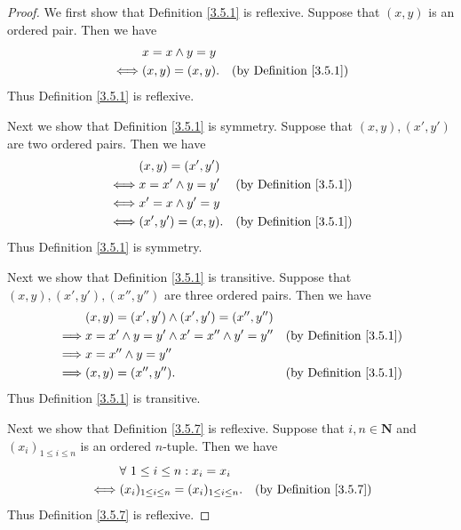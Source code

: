 \begin{proof}
    We first show that Definition \ref{3.5.1} is reflexive.
    Suppose that \((x, y)\) is an ordered pair.
    Then we have
    \begin{align*}
             & x = x \land y = y                                      \\
        \iff & (x, y) = (x, y).  & \text{(by Definition \ref{3.5.1})}
    \end{align*}
    Thus Definition \ref{3.5.1} is reflexive.

    Next we show that Definition \ref{3.5.1} is symmetry.
    Suppose that \((x, y), (x', y')\) are two ordered pairs.
    Then we have
    \begin{align*}
             & (x, y) = (x', y')                                        \\
        \iff & x = x' \land y = y' & \text{(by Definition \ref{3.5.1})} \\
        \iff & x' = x \land y' = y                                      \\
        \iff & (x', y') = (x, y).  & \text{(by Definition \ref{3.5.1})}
    \end{align*}
    Thus Definition \ref{3.5.1} is symmetry.

    Next we show that Definition \ref{3.5.1} is transitive.
    Suppose that \((x, y), (x', y'), (x'', y'')\) are three ordered pairs.
    Then we have
    \begin{align*}
                 & (x, y) = (x', y') \land (x', y') = (x'', y'')                                          \\
        \implies & x = x' \land y = y' \land x' = x'' \land y' = y'' & \text{(by Definition \ref{3.5.1})} \\
        \implies & x = x'' \land y = y''                                                                  \\
        \implies & (x, y) = (x'', y'').                              & \text{(by Definition \ref{3.5.1})}
    \end{align*}
    Thus Definition \ref{3.5.1} is transitive.

    Next we show that Definition \ref{3.5.7} is reflexive.
    Suppose that \(i, n \in \mathbf{N}\) and \((x_i)_{1 \leq i \leq n}\) is an ordered \(n\)-tuple.
    Then we have
    \begin{align*}
             & \forall\ 1 \leq i \leq n : x_i = x_i                                                    \\
        \iff & (x_i)_{1 \leq i \leq n} = (x_i)_{1 \leq i \leq n}. & \text{(by Definition \ref{3.5.7})}
    \end{align*}
    Thus Definition \ref{3.5.7} is reflexive.


\end{proof}
